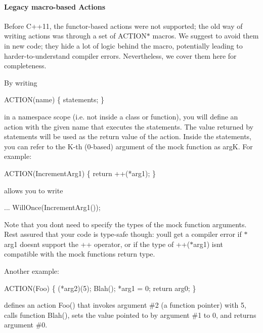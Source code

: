 \paragraph*{Legacy macro-\/based Actions}

Before C++11, the functor-\/based actions were not supported; the old way of writing actions was through a set of {\ttfamily A\+C\+T\+I\+O\+N$\ast$} macros. We suggest to avoid them in new code; they hide a lot of logic behind the macro, potentially leading to harder-\/to-\/understand compiler errors. Nevertheless, we cover them here for completeness.

By writing


\begin{DoxyCode}
ACTION(name) \{ statements; \}
\end{DoxyCode}


in a namespace scope (i.\+e. not inside a class or function), you will define an action with the given name that executes the statements. The value returned by {\ttfamily statements} will be used as the return value of the action. Inside the statements, you can refer to the K-\/th (0-\/based) argument of the mock function as {\ttfamily argK}. For example\+:


\begin{DoxyCode}
ACTION(IncrementArg1) \{ \textcolor{keywordflow}{return} ++(*arg1); \}
\end{DoxyCode}


allows you to write


\begin{DoxyCode}
... WillOnce(IncrementArg1());
\end{DoxyCode}


Note that you don\textquotesingle{}t need to specify the types of the mock function arguments. Rest assured that your code is type-\/safe though\+: you\textquotesingle{}ll get a compiler error if {\ttfamily $\ast$arg1} doesn\textquotesingle{}t support the {\ttfamily ++} operator, or if the type of {\ttfamily ++($\ast$arg1)} isn\textquotesingle{}t compatible with the mock function\textquotesingle{}s return type.

Another example\+:


\begin{DoxyCode}
ACTION(Foo) \{
  (*arg2)(5);
  Blah();
  *arg1 = 0;
  \textcolor{keywordflow}{return} arg0;
\}
\end{DoxyCode}


defines an action {\ttfamily Foo()} that invokes argument \#2 (a function pointer) with 5, calls function {\ttfamily Blah()}, sets the value pointed to by argument \#1 to 0, and returns argument \#0.

